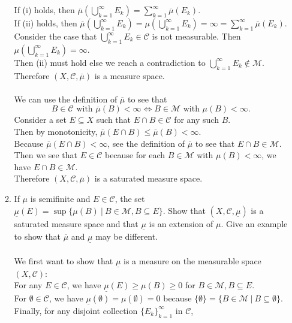\begin{enumerate}
\begin{enumerate}[label=(\roman*),align=left]
		If (i) holds, then $\overline\mu(\bigcup_{k=1}^\infty E_k)=\sum_{k=1}^\infty\overline\mu(E_k)$.\\
		If (ii) holds, then $\overline\mu(\bigcup_{k=1}^\infty E_k)=\mu(\bigcup_{k=1}^\infty E_k)=\infty=\sum_{k=1}^\infty \overline\mu(E_k)$.\\\bigskip
		Consider the case that $\bigcup_{k=1}^\infty E_k\in\mathcal{C}$ is not measurable. Then $\mu(\bigcup_{k=1}^\infty E_k)=\infty$. \\
		Then (ii) must hold else we reach a contradiction to $\bigcup_{k=1}^\infty E_k\notin\mathcal{M}$.\\\bigskip
		Therefore $(X,\mathcal{C},\overline\mu)$ is a measure space.\\
		\\We can use the definition of $\overline\mu$ to see that 
		\[
			B\in\mathcal{C}\text{ with }\overline\mu(B)<\infty\iff B\in\mathcal{M}\text{ with }\mu(B)<\infty.
		\]
		Consider a set $E\subseteq X$ such that $E\cap B\in\mathcal{C}$ for any such $B$.
		\\Then by monotonicity, $\overline\mu(E\cap B)\le \overline\mu(B)<\infty$.
		\\Because $\overline\mu(E\cap B)<\infty$, see the definition of $\overline\mu$ to see that $E\cap B\in\mathcal{M}$.
		\\Then we see that $E\in\mathcal{C}$ because for each $B\in\mathcal{M}$ with $\mu(B)<\infty$, we have $E\cap B\in\mathcal{M}$.\\\bigskip
		Therefore $(X,\mathcal{C},\overline\mu)$ is a saturated measure space.
		\item If $\mu$ is semifinite and $E\in\mathcal{C}$, the set $\underline\mu(E)=\sup\{\mu(B)\ |\ B\in\mathcal{M},B\subseteq E\}$.
		Show that $(X,\mathcal{C},\underline\mu)$ is a saturated measure space and that $\underline\mu$ is an extension of $\mu$.
		Give an example to show that $\overline\mu$ and $\underline\mu$ may be different.\\
		\\We first want to show that $\underline\mu$ is a measure on the measurable space $(X,\mathcal{C})$:
		\\For any $E\in\mathcal{C}$, we have $\underline\mu(E)\ge\mu(B)\ge0$ for $B\in\mathcal{M},B\subseteq E$.
		\\For $\emptyset\in\mathcal{C}$, we have $\underline\mu(\emptyset)=\mu(\emptyset)=0$ because $\{\emptyset\}=\{B\in\mathcal{M}\ |\ B\subseteq\emptyset\}$.
		\\Finally, for any disjoint collection $\{E_k\}_{k=1}^\infty$ in $\mathcal{C}$,\\

\end{enumerate}
\end{enumerate}
